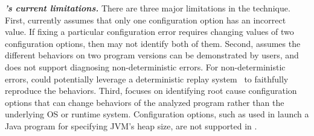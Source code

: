 
\vspace{1mm}
\noindent \textbf{\textit{\ourtool's current limitations.}}
There are three major limitations in the \ourtool technique.
First, \ourtool currently assumes that only one
configuration option has an incorrect value.
If fixing a particular configuration error
requires changing values of two configuration options,
then \ourtool may not identify both of them.
Second, \ourtool assumes the different behaviors
on two program versions can be demonstrated by users,
and does not support diagnosing non-deterministic
errors. For non-deterministic errors, \ourtool
could potentially leverage a deterministic replay
system~\cite{Huang:2013:CRL, Jin:2012:BRF} to faithfully reproduce the behaviors.
Third, \ourtool focuses on identifying root cause
configuration options that can change behaviors of
the analyzed program rather than the underlying OS
or runtime system. Configuration options, such
as  used in launch a Java program for
specifying JVM's heap size, are not supported
in \ourtool.
